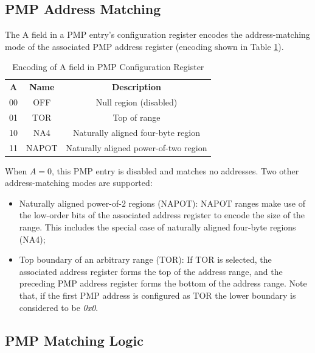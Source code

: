 \subsection{PMP Address Matching}
\label{subsec:pmpaddressmatching}

The A field in a PMP entry's configuration register encodes the address-matching
mode of the associated PMP address register (encoding shown in Table \ref{tab:addressmatching}).

\begin{table}
  \centering
  \begin{tabular}{|c|c|c|}
    \hline
    \textbf{A}       & \textbf{Name} & \textbf{Description}                  \\
    \hhline {===} 00 & OFF           & Null region (disabled)                \\
    \hline
    01               & TOR           & Top of range                          \\
    \hline
    10               & NA4           & Naturally aligned four-byte region    \\
    \hline
    11               & NAPOT         & Naturally aligned power-of-two region \\
    \hline
  \end{tabular}
  \caption{Encoding of A field in PMP Configuration Register}
  \label{tab:addressmatching}
\end{table}

When $A=0$, this PMP entry is disabled and matches no addresses. Two other address-matching
modes are supported:
\begin{itemize}
  \item Naturally aligned power-of-$2$ regions (NAPOT): NAPOT ranges make use of
    the low-order bits of the associated address register to encode the size of
    the range. This includes the special case of naturally aligned four-byte regions
    (NA4);

  \item Top boundary of an arbitrary range (TOR): If TOR is selected, the associated
    address register forms the top of the address range, and the preceding PMP
    address register forms the bottom of the address range. Note that, if the
    first PMP address is configured as TOR the lower boundary is considered to
    be \textit{0x0}.
\end{itemize}

\subsection{PMP Matching Logic}
\label{subsec:matchinglogic}

